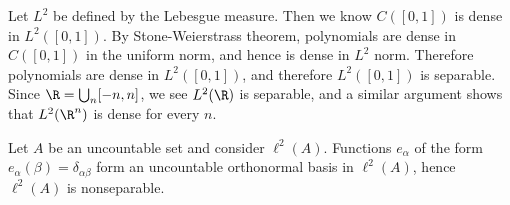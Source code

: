 \begin{example}
Let $L^2$ be defined by the Lebesgue measure. Then we know $C([0,1])$ is dense in $L^2([0,1])$. By Stone-Weierstrass theorem, polynomials are dense in $C([0,1])$ in the uniform norm, and hence is dense in $L^2$ norm. Therefore polynomials are dense in $L^2([0,1])$, and therefore $L^2([0,1])$ is separable. Since $\R=\bigcup_n[-n,n]$, we see $L^2(\R)$ is separable, and a similar argument shows that $L^2(\R^n)$ is dense for every $n$. 
\end{example}
\begin{example}
Let $A$ be an uncountable set and consider $\ell^2(A)$. Functions $e_{\alpha}$ of the form $e_{\alpha}(\beta)=\delta_{\alpha\beta}$ form an uncountable orthonormal basis in $\ell^2(A)$, hence $\ell^2(A)$ is nonseparable.
\end{example}
